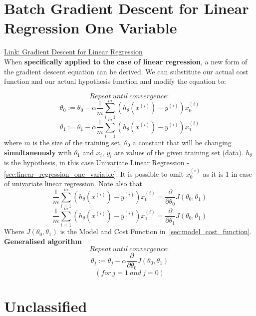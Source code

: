 \documentclass[a4paper]{report}
\begin{document}
\section{Batch Gradient Descent for Linear Regression One Variable}
\label{sec:gr_desc_lin_regr_one_var}
\href{https://www.coursera.org/learn/machine-learning/supplement/U90DX/gradient-descent-for-linear-regression}{Link: Gradient Descent for Linear Regression} \\
When \textbf{specifically applied to the case of linear regression}, a new form of the gradient descent equation can be derived. We can substitute our actual cost function and our actual hypothesis function and modify the equation to:

$$Repeat\ until\ convergence:$$
$$\theta_0:=\theta_0-\alpha\dfrac{1}{m}\sum_{i=1}^{m}(h_\theta(x^{(i)})-y^{(i)})x_0^{(i)}$$
$$\theta_1:=\theta_1-\alpha\dfrac{1}{m}\sum_{i=1}^{m}(h_\theta(x^{(i)})-y^{(i)})x_1^{(i)}$$
where $m$ is the size of the training set, $\theta_0$ a constant that will be changing \textbf{simultaneously} with $\theta_1$ and $x_i$, $y_i$ are values of the given training set (data). $h_\theta$ is the hypothesis, in this case Univariate Linear Regression - \autoref{sec:linear_regression_one_variable}. It is possible to omit $x_0^{(i)}$ as it is 1 in case of univariate linear regression. Note also that
$$\dfrac{1}{m}\sum_{i=1}^{m}(h_\theta(x^{(i)})-y^{(i)})x_0^{(i)}=\dfrac{\partial}{\partial\theta_0}J(\theta_0,\theta_1)$$
$$\dfrac{1}{m}\sum_{i=1}^{m}(h_\theta(x^{(i)})-y^{(i)})x_1^{(i)}=\dfrac{\partial}{\partial\theta_1}J(\theta_0,\theta_1)$$
Where $J(\theta_0,\theta_1)$ is the Model and Cost Function in~\autoref{sec:model_cost_function}.
\\\newline
\noindent\textbf{Generalised algorithm}
$$Repeat\ until\ convergence:$$
$$\theta_j:=\theta_j-\alpha \dfrac{\partial}{\partial\theta_0}J(\theta_0,\theta_1)$$
$$(for\ j = 1\ and\ j = 0)$$

\section{Unclassified}
\label{sec:Unclassified}
\end{document}
